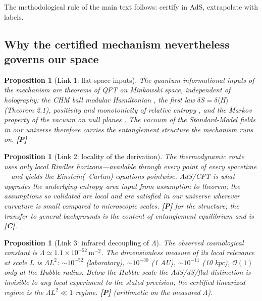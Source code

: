 \documentclass[11pt]{article}
\newtheorem{proposition}[theorem]{Proposition}
\theoremstyle{definition}
\newcommand{\pP}{\textbf{[P]}}
\newcommand{\pC}{\textbf{[C]}}
\begin{document}
The methodological rule of the main text follows: certify in AdS,
extrapolate with labels.

\subsection{Why the certified mechanism nevertheless governs our space}

\begin{proposition}[Link 1: flat-space inputs]
The quantum-informational inputs of the mechanism are theorems of QFT on
Minkowski space, independent of holography: the CHM ball modular
Hamiltonian \cite{CHM2011}, the first law
$\delta S=\delta\langle H\rangle$ (Theorem 2.1), positivity and
monotonicity of relative entropy \cite{Casini2008,BlancoCasini2013}, and
the Markov property of the vacuum on null planes
\cite{CasiniTesteTorroba2017}. The vacuum of the Standard-Model fields in
our universe therefore carries the entanglement structure the mechanism
runs on. \pP{}
\end{proposition}

\begin{proposition}[Link 2: locality of the derivation]
The thermodynamic route \cite{Jacobson1995,DLP2017} uses only local
Rindler horizons---available through every point of every spacetime---and
yields the Einstein(--Cartan) equations pointwise. AdS/CFT is what
upgrades the underlying entropy--area input from assumption to theorem;
the assumptions so validated are local and are satisfied in our universe
wherever curvature is small compared to microscopic scales. \pP{} for the
structure; the transfer to general backgrounds is the content of
entanglement equilibrium \cite{Jacobson2016} and is \pC{}.
\end{proposition}

\begin{proposition}[Link 3: infrared decoupling of $\Lambda$]
The observed cosmological constant is
$\Lambda\simeq1.1\times10^{-52}\,\mathrm{m}^{-2}$. The dimensionless
measure of its local relevance at scale $L$ is $\Lambda L^2$:
$\sim10^{-52}$ (laboratory), $\sim10^{-30}$ (1 AU), $\sim10^{-11}$
(10 kpc), $\mathcal{O}(1)$ only at the Hubble radius. Below the Hubble
scale the AdS/dS/flat distinction is invisible to any local experiment to
the stated precision; the certified linearized regime is the
$\Lambda L^2\ll1$ regime. \pP{} (arithmetic on the measured $\Lambda$).
\end{proposition}
\end{document}
